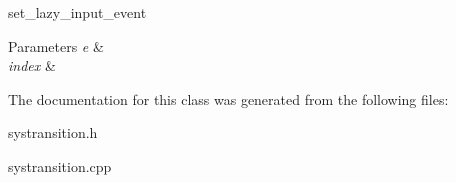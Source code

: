 set\+\_\+lazy\+\_\+input\+\_\+event 


\begin{DoxyParams}{Parameters}
{\em e} & \\
\hline
{\em index} & \\
\hline
\end{DoxyParams}


The documentation for this class was generated from the following files\+:\begin{DoxyCompactItemize}
\item 
systransition.\+h\item 
systransition.\+cpp\end{DoxyCompactItemize}
